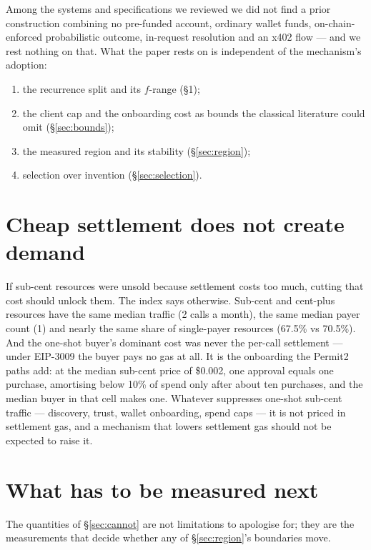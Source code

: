 \documentclass[11pt,a4paper]{article}
\newcommand{\dollar}[1]{\$#1}
\begin{document}
Among the systems and specifications we reviewed we did not find a prior construction combining no pre-funded
account, ordinary wallet funds, on-chain-enforced probabilistic outcome, in-request resolution and an x402 flow
--- and we rest nothing on that. What the paper rests on is independent of the mechanism's adoption:

\begin{enumerate}[label=(\arabic*)]
\item the recurrence split and its $f$-range (\S1);
\item the client cap and the onboarding cost as bounds the classical literature could omit (\S\ref{sec:bounds});
\item the measured region and its stability (\S\ref{sec:region});
\item selection over invention (\S\ref{sec:selection}).
\end{enumerate}

\section{Cheap settlement does not create demand}

If sub-cent resources were unsold because settlement costs too much, cutting that cost should unlock them. The
index says otherwise. Sub-cent and cent-plus resources have the same median traffic (2 calls a month), the same
median payer count (1) and nearly the same share of single-payer resources (67.5\% vs 70.5\%). And the one-shot
buyer's dominant cost was never the per-call settlement --- under EIP-3009 the buyer pays no gas at all. It is
the onboarding the Permit2 paths add: at the median sub-cent price of \dollar{0.002}, one approval equals one
purchase, amortising below 10\% of spend only after about ten purchases, and the median buyer in that cell makes
one. Whatever suppresses one-shot sub-cent traffic --- discovery, trust, wallet onboarding, spend caps --- it is
not priced in settlement gas, and a mechanism that lowers settlement gas should not be expected to raise it.

\section{What has to be measured next}\label{sec:measure}

The quantities of \S\ref{sec:cannot} are not limitations to apologise for; they are the measurements that decide
whether any of \S\ref{sec:region}'s boundaries move.
\end{document}

